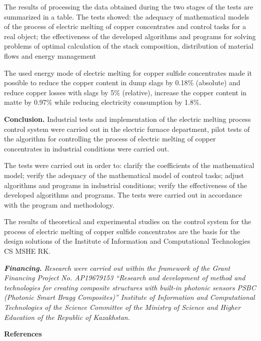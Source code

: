 \begin{multicols}{2}
The results of processing the data obtained during the two stages of the
tests are summarized in a table. The tests showed: the adequacy of
mathematical models of the process of electric melting of copper
concentrates and control tasks for a real object; the effectiveness of
the developed algorithms and programs for solving problems of optimal
calculation of the stack composition, distribution of material flows and
energy management

The used energy mode of electric melting for copper sulfide concentrates
made it possible to reduce the copper content in dump slags by 0.18\%
(absolute) and reduce copper losses with slags by 5\% (relative),
increase the copper content in matte by 0.97\% while reducing
electricity consumption by 1.8\%.

{\bfseries Conclusion.} Industrial tests and implementation of the electric
melting process control system were carried out in the electric furnace
department, pilot tests of the algorithm for controlling the process of
electric melting of copper concentrates in industrial conditions were
carried out.

The tests were carried out in order to: clarify the coefficients of the
mathematical model; verify the adequacy of the mathematical model of
control tasks; adjust algorithms and programs in industrial conditions;
verify the effectiveness of the developed algorithms and programs. The
tests were carried out in accordance with the program and methodology.

The results of theoretical and experimental studies on the control
system for the process of electric melting of copper sulfide
concentrates are the basis for the design solutions of the Institute of
Information and Computational Technologies CS MSHE RK.

\emph{{\bfseries Financing.} Research were carried out within the framework
of the Grant Financing Project No. AP19679153 ``Research and development
of method and technologies for creating composite structures with
built-in photonic sensors PSBC (Photonic Smart Bragg Composites)''
Institute of Information and Computational Technologies of the Science
Committee of the Ministry of Science and Higher Education of the
Republic of Kazakhstan.}
\end{multicols}

\begin{center}
{\bfseries References}
\end{center}

